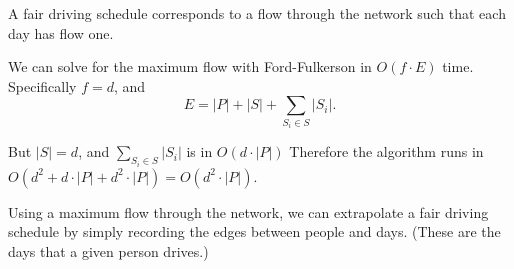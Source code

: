 \documentclass{amsart}
\theoremstyle{definition}
\theoremstyle{remark}
\numberwithin{equation}{section}
\begin{document}
\claimstar A fair driving schedule corresponds to a flow through the network such that each day has flow one.


\rmkstar We can solve for the maximum flow with Ford-Fulkerson in $O(f \cdot E)$ time. Specifically $f=d$, and
$$E= |P| + |S| + \sum_{S_i \in S} |S_i|.$$

But $|S|=d$, and $\sum_{S_i \in S} |S_i|$ is in $O(d \cdot |P|)$ Therefore the algorithm runs in $O(d^2 + d \cdot |P| + d^2 \cdot |P|) = O(d^2 \cdot |P|)$.

\rmkstar Using a maximum flow through the network, we can extrapolate a fair driving schedule by simply recording the edges between people and days. (These are the days that a given person drives.)
\end{document}
